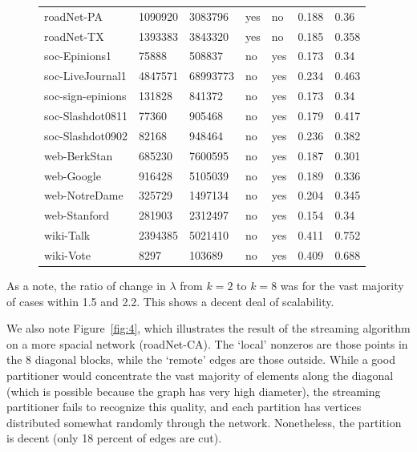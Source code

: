 \begin{figure}
{\begin{tabular}{ *7l }
roadNet-PA & 1090920 & 3083796 & yes & no & 0.188&0.36\\ 
roadNet-TX & 1393383 & 3843320 & yes & no & 0.185&0.358\\ 
soc-Epinions1 & 75888 & 508837 & no & yes & 0.173&0.34\\ 
soc-LiveJournal1 & 4847571 & 68993773 & no & yes &0.234& 0.463\\ 
soc-sign-epinions & 131828 & 841372 & no & yes &0.173&0.34\\ 
soc-Slashdot0811 & 77360 & 905468 & no & yes &0.179&0.417\\ 
soc-Slashdot0902 & 82168 & 948464 & no & yes &0.236&0.382\\ 
web-BerkStan & 685230 & 7600595 & no & yes &0.187&0.301\\ 
web-Google & 916428 & 5105039 & no & yes &0.189&0.336\\ 
web-NotreDame & 325729 & 1497134 & no & yes &0.204&0.345\\ 
web-Stanford & 281903 & 2312497 & no & yes &0.154&0.34\\ 
wiki-Talk & 2394385 & 5021410 & no & yes &0.411&0.752\\ 
wiki-Vote  & 8297 & 103689 & no & yes &0.409&0.688\\ 
 \hline
\end{tabular}\par
}
\end{figure}

As a note, the ratio of change in $\lambda$ from $k=2$ to $k=8$ was for the vast majority of cases within 1.5 and 2.2. This shows a decent deal of scalability.

We also note Figure~\ref{fig:4}, which illustrates the result of the streaming algorithm on a more spacial network (roadNet-CA). The `local' nonzeros are those points in the 8 diagonal blocks, while the `remote' edges are those outside. While a good partitioner would concentrate the vast majority of elements along the diagonal (which is possible because the graph has very high diameter), the streaming partitioner fails to recognize this quality, and each partition has vertices distributed somewhat randomly through the network. Nonetheless, the partition is decent (only 18 percent of edges are cut). 

